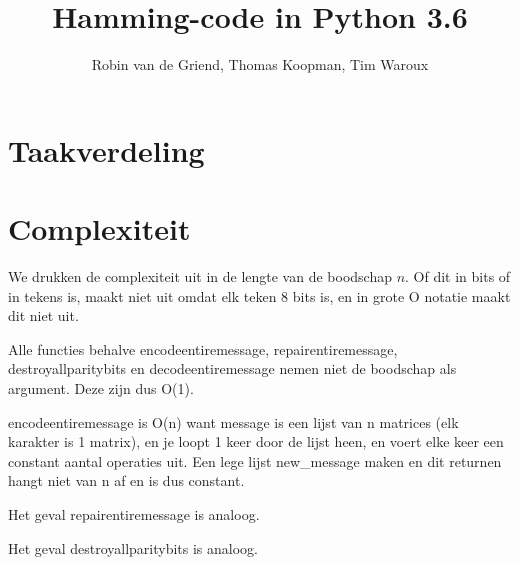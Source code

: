 \documentclass[a4paper]{article}
\begin{document}
\title{Hamming-code in Python 3.6}
\author{Robin van de Griend, Thomas Koopman, Tim Waroux}
\maketitle

\section{Taakverdeling}

\section{Complexiteit}
We drukken de complexiteit uit in de lengte van de boodschap \(n\). Of dit in bits of in tekens is, maakt niet uit omdat elk teken 8 bits is, en in grote O notatie maakt dit niet uit.

Alle functies behalve encodeentiremessage, repairentiremessage, destroyallparitybits en decodeentiremessage nemen niet de
boodschap als argument. Deze zijn dus O(1).

encodeentiremessage is O(n) want message is een lijst van n matrices (elk karakter is 1 matrix), en je loopt 1 keer door de lijst heen, en voert elke keer een constant aantal operaties uit. Een lege lijst new_message maken en dit returnen hangt niet van n af en is dus constant.

Het geval repairentiremessage is analoog.

Het geval destroyallparitybits is analoog.
\end{document}

